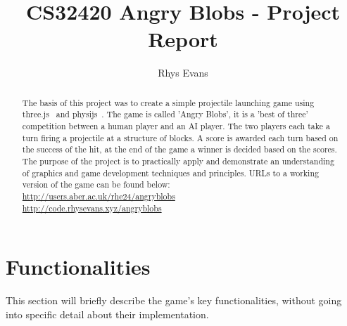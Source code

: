 \documentclass[runningheads]{llncs}
\begin{document}
	\title{CS32420 Angry Blobs - Project Report}
	\author{Rhys Evans}
	\maketitle
	
	\begin{abstract}
		The basis of this project was to create a simple projectile launching game using three.js~\cite{ref_threejs} and physijs~\cite{ref_physijs}. The game is called 'Angry Blobs', it is a 'best of three' competition between a human player and an AI player. The two players each take a turn firing a projectile at a structure of blocks. A score is awarded each turn based on the success of the hit, at the end of the game a winner is decided based on the scores. The purpose of the project is to practically apply and demonstrate an understanding of graphics and game development techniques and principles. URLs to a working version of the game can be found below:\\ \url{http://users.aber.ac.uk/rhe24/angryblobs} \\ \url{http://code.rhysevans.xyz/angryblobs}
	\end{abstract}
	
	\newpage
	\section{Functionalities} \label{functionalities}
	This section will briefly describe the game's key functionalities, without going into specific detail about their implementation.
\end{document}
